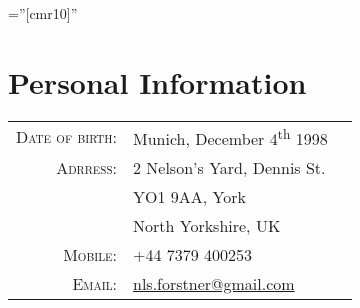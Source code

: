 \documentclass[a4paper,10pt]{article}
\begin{document}
\pagestyle{empty} %

\font\fb=''[cmr10]'' %

\par{
    \bigskip\par
}


\section{Personal Information}

\begin{tabular}{rll}
    \textsc{Date of birth:} & Munich, December 4\textsuperscript{th} 1998 \\
    \textsc{Adrress:}       & 2 Nelson's Yard, Dennis St. \\
    \textsc{}               & YO1 9AA, York \\
    \textsc{}               & North Yorkshire, UK \\
    \textsc{Mobile:}        & +44 7379 400253\\
    \textsc{Email:}         & \href{mailto:nls.forstner@gmail.com}{nls.forstner@gmail.com} \\

\end{tabular}
\end{document}
